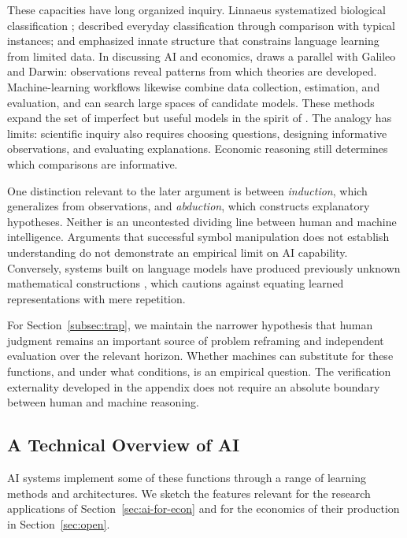 \documentclass[12pt]{article}
\theoremstyle{plain}
\theoremstyle{definition}
\theoremstyle{remark}
\begin{document}
These capacities have long organized inquiry. Linnaeus systematized
biological classification \citep{Linnaeus1758}; \citet{Rosch1975}
described everyday classification through comparison with typical
instances; and \citet{Chomsky1965} emphasized innate structure that
constrains language learning from limited data. In discussing AI and
economics, \citet{Sargent2025SourcesAI} draws a parallel with Galileo
and Darwin: observations reveal patterns from which theories are
developed. Machine-learning workflows likewise combine data collection,
estimation, and evaluation, and can search large spaces of candidate
models. These methods expand the set of imperfect but useful
models in the spirit of \citet{Box1976}. The analogy has limits:
scientific inquiry also requires choosing questions, designing
informative observations, and evaluating explanations. Economic
reasoning still determines which comparisons are informative.

One distinction relevant to the later argument is between
\emph{induction}, which generalizes from observations, and
\emph{abduction}, which constructs explanatory hypotheses. Neither is
an uncontested dividing line between human and machine intelligence.
Arguments that successful symbol manipulation does not establish
understanding do not demonstrate an empirical limit on AI capability.
Conversely, systems built
on language models have produced previously unknown mathematical
constructions \citep{RomeraParedes2024FunSearch}, which cautions against
equating learned representations with mere repetition.

For Section~\ref{subsec:trap}, we maintain the narrower hypothesis that
human judgment remains an important source of problem reframing and
independent evaluation over the relevant horizon. Whether machines can
substitute for these functions, and under what conditions, is an
empirical question. The verification externality developed in the
appendix does not require an absolute boundary between human and
machine reasoning.

\subsection{A Technical Overview of AI}\label{subsec:ai-tech}

AI systems implement some of these functions through a range of
learning methods and architectures. We sketch the features relevant for the research applications of
Section~\ref{sec:ai-for-econ} and for the economics of their production
in Section~\ref{sec:open}.
\end{document}
